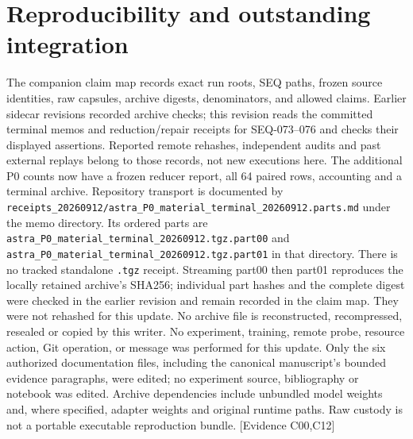\documentclass[11pt]{article}
\newcommand{\ev}[1]{\textsf{[Evidence #1]}}
\begin{document}
\section*{Reproducibility and outstanding integration}
The companion claim map records exact run roots, SEQ paths, frozen source
identities, raw capsules, archive digests, denominators, and allowed claims.
Earlier sidecar revisions recorded archive checks; this revision reads the
committed terminal memos and reduction/repair receipts for SEQ-073--076 and
checks their displayed assertions. Reported remote rehashes, independent audits
and past external replays belong to those records, not new executions here.
The additional P0 counts now have a frozen reducer report, all 64 paired rows,
accounting and a terminal archive. Repository transport is documented by
\texttt{receipts\_20260912/}\allowbreak\texttt{astra\_P0\_material\_terminal\_20260912.parts.md}
under the memo directory. Its ordered parts are
\texttt{astra\_P0\_material\_terminal\_20260912.tgz.part00} and
\texttt{astra\_P0\_material\_terminal\_20260912.tgz.part01} in that directory.
There is no tracked standalone \texttt{.tgz} receipt. Streaming part00 then part01
reproduces the locally retained archive's SHA256; individual part hashes and
the complete digest were checked in the earlier revision and remain recorded
in the claim map. They were not rehashed for this update. No archive
file is reconstructed, recompressed, resealed or copied by this writer.
No experiment, training, remote probe, resource action, Git operation, or message
was performed for this update. Only the six authorized documentation files,
including the canonical manuscript's bounded evidence paragraphs, were edited;
no experiment source, bibliography or notebook was edited. Archive dependencies
include unbundled model weights and,
where specified, adapter weights and original runtime paths. Raw custody is not
a portable executable reproduction bundle. \ev{C00,C12}
\end{document}
